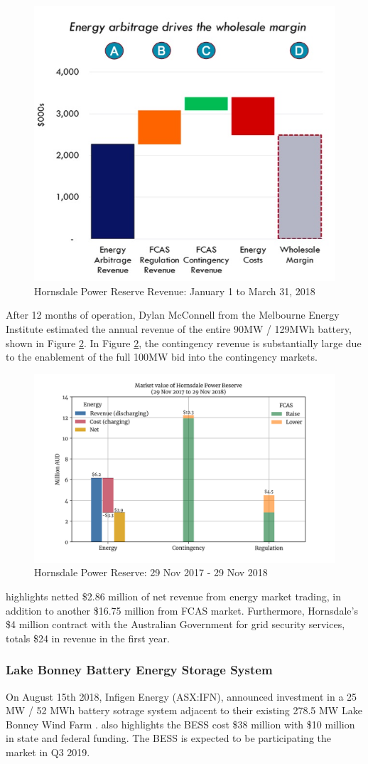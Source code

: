 \begin{figure}
    \centering
    \includegraphics[width=.6\textwidth]{Pictures/Chapter2/hpr_first_3_months.jpg}
    \caption{Hornsdale Power Reserve Revenue: January 1 to March 31, 2018}
    \label{fig:hpr_3_mon_rev}
\end{figure}
After 12 months of operation, Dylan McConnell from the Melbourne Energy Institute estimated the annual revenue of the entire 90MW / 129MWh battery, shown in Figure \ref{fig:hpr_12_mon_rev}. In Figure \ref{fig:hpr_12_mon_rev}, the contingency revenue is substantially large due to the enablement of the full 100MW bid into the contingency markets. 
\begin{figure}
    \centering
    \includegraphics[width=.8\textwidth]{Pictures/Chapter2/hpr_revenue.png}
    \caption{Hornsdale Power Reserve: 29 Nov 2017 - 29 Nov 2018}
    \label{fig:hpr_12_mon_rev}
\end{figure}
\parencite{hornsdale_savings} highlights netted \$2.86 million of net revenue from energy market trading, in addition to another \$16.75 million from FCAS market. Furthermore, Hornsdale's \$4 million contract with the Australian Government for grid security services, totals \$24 in revenue in the first year. 
\subsubsection{ Lake Bonney Battery Energy Storage System }
\label{sec:ifn}
On August 15th 2018, Infigen Energy (ASX:IFN), announced investment in a 25 MW / 52 MWh battery sotrage system adjacent to their existing 278.5 MW Lake Bonney Wind Farm \parencite{IFN_AFR}. \textcite{IFN_AFR} also highlights the BESS cost \$38 million with \$10 million in state and federal funding. The BESS is expected to be participating the market in Q3 2019.
